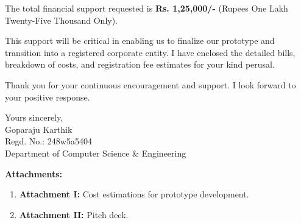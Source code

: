 \documentclass[12pt,a4paper]{article}
\begin{document}
The total financial support requested is \textbf{Rs. 1,25,000/-} (Rupees One Lakh Twenty-Five Thousand Only). 

This support will be critical in enabling us to finalize our prototype and transition into a registered corporate entity. I have enclosed the detailed bills, breakdown of costs, and registration fee estimates for your kind perusal.

Thank you for your continuous encouragement and support. I look forward to your positive response.

\vspace{1.5em}

\begin{flushleft}
    Yours sincerely, \\
    \vspace{1.5em}
    Goparaju Karthik \\
    Regd. No.: 248w5a5404 \\
    Department of Computer Science \& Engineering
\end{flushleft}

\vspace{1.5em}
\noindent \textbf{Attachments:}
\begin{enumerate}
    \item \textbf{Attachment I:} Cost estimations for prototype development.
    \item \textbf{Attachment II:} Pitch deck.
\end{enumerate}
\end{document}
